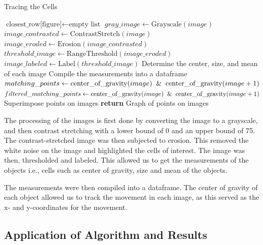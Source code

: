 \documentclass{article}
\begin{document}
\begin{algorithm}[h!]
\caption{Tracing the Cells}\label{cell-trace}
\begin{algorithmic}[1]
    \State $\text{closest\_row[figure]} \gets \text{empty list}$
        \State $gray\_image \gets \text{Grayscale}(image)$
        \State $image\_contrasted \gets \text{ContrastStretch}(image)$
        \State $image\_eroded \gets \text{Erosion}(image\_contrasted)$
        \State $threshold\_image \gets \text{RangeThreshold}(image\_eroded)$
        \State $image\_labeled \gets \text{Label}(threshold\_image)$
        \State Determine the center, size, and mean of each image
    \EndFor
    \State Compile the measurements into a dataframe
        \State $matching\_points \gets \text{center\_of\_gravity}(image) \And \text{center\_of\_gravity}(image+1)$
        \State $filtered\_matching\_points \gets \text{center\_of\_gravity}(image) \And \text{center\_of\_gravity}(image+1)$
        \State Superimpose points on images
    \EndFor
    \State \textbf{return} Graph of points on images
\EndProcedure
\end{algorithmic}
\end{algorithm}

\par The processing of the images is first done by converting the image to a grayscale, and then contrast stretching with a lower bound of 0 and an upper bound of 75. The contrast-stretched image was then subjected to erosion. This removed the white noise on the image and highlighted the cells of interest. The image was then, thresholded and labeled. This allowed us to get the measurements of the objects i.e., cells such as center of gravity, size and mean of the objects. 
\par The measurements were then compiled into a dataframe. The center of gravity of each object allowed us to track the movement in each image, as this served as the x- and y-coordinates for the movement. 
\subsection*{Application of Algorithm and Results}
\end{document}
